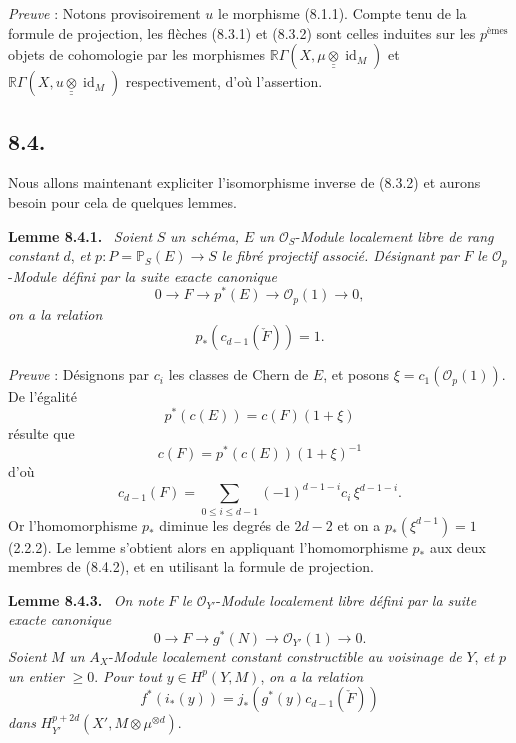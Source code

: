 \documentclass[11pt]{article}
\newenvironment{statement}[1]{\par\medskip\noindent\textbf{#1.}\ }{\par\medskip}
\newcommand{\R}{\mathbb{R}}\newcommand{\RHomCore}{\mathbb{R}\mathrm{Hom}}
\providecommand{\R}{\mathrm R}
\begin{document}
\emph{Preuve} : Notons provisoirement $u$ le morphisme (8.1.1). Compte tenu de la formule de projection, les flèches (8.3.1) et (8.3.2) sont celles induites sur les $p^{\text{èmes}}$ objets de cohomologie par les morphismes $\R\Gamma(X,\mu\mathbin{\underline{\underline{\otimes}}}\operatorname{id}_M)$ et $\R\Gamma(X,u\mathbin{\underline{\underline{\otimes}}}\operatorname{id}_M)$ respectivement, d'où l'assertion.

\subsection*{8.4.}

Nous allons maintenant expliciter l'isomorphisme inverse de (8.3.2) et aurons besoin pour cela de quelques lemmes.

\begin{statement}{Lemme 8.4.1}
\emph{Soient} $S$ \emph{un schéma,} $E$ \emph{un} $\mathcal O_S$-\emph{Module localement libre de rang constant} $d$, \emph{et} $p:P=\mathbb P_S(E)\to S$ \emph{le fibré projectif associé. Désignant par} $F$ \emph{le} $\mathcal O_p$-\emph{Module défini par la suite exacte canonique}
\[
0\to F\to p^*(E)\to\mathcal O_p(1)\to0,
\]
\emph{on a la relation}
\[
p_*(c_{d-1}(\check F))=1.
\]
\end{statement}

\emph{Preuve} : Désignons par $c_i$ les classes de Chern de $E$, et posons $\xi=c_1(\mathcal O_p(1))$. De l'égalité
\[
p^*(c(E))=c(F)(1+\xi)
\]
résulte que
\[
c(F)=p^*(c(E))(1+\xi)^{-1}
\]
d'où
\[
c_{d-1}(F)=\sum_{0\le i\le d-1}(-1)^{d-1-i}c_i\,\xi^{d-1-i}.
\tag{8.4.2}
\]
Or l'homomorphisme $p_*$ diminue les degrés de $2d-2$ et on a $p_*(\xi^{d-1})=1$ (2.2.2). Le lemme s'obtient alors en appliquant l'homomorphisme $p_*$ aux deux membres de (8.4.2), et en utilisant la formule de projection.

\begin{statement}{Lemme 8.4.3}
\emph{On note} $F$ \emph{le} $\mathcal O_{Y'}$-\emph{Module localement libre défini par la suite exacte canonique}
\[
0\to F\to g^*(N)\to\mathcal O_{Y'}(1)\to0.
\]
\emph{Soient} $M$ \emph{un} $A_X$-\emph{Module localement constant constructible au voisinage de} $Y$, \emph{et} $p$ \emph{un entier} $\ge0$. \emph{Pour tout} $y\in H^p(Y,M)$, \emph{on a la relation}
\[
f^*(i_*(y))=j_*(g^*(y)c_{d-1}(\check F))
\]
\emph{dans} $H_{Y'}^{p+2d}(X',M\otimes\mu^{\otimes d})$.
\end{statement}
\end{document}

